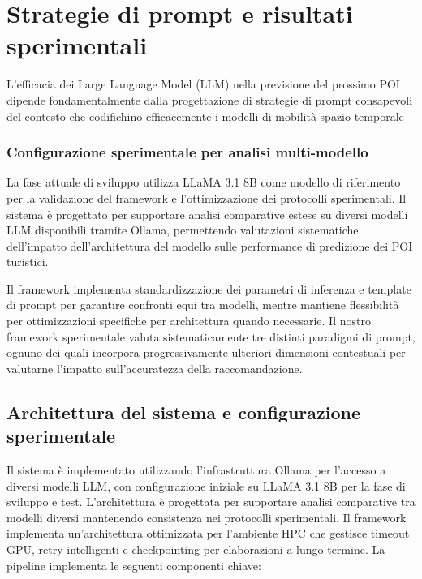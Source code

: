 \chapter{Strategie di prompt e risultati sperimentali}

L'efficacia dei Large Language Model (LLM) nella previsione del prossimo POI dipende fondamentalmente dalla progettazione di strategie di prompt consapevoli del contesto che codifichino efficacemente i modelli di mobilità spazio-temporale

\subsection{Configurazione sperimentale per analisi multi-modello}

La fase attuale di sviluppo utilizza LLaMA 3.1 8B come modello di riferimento per la validazione del framework e l'ottimizzazione dei protocolli sperimentali. Il sistema è progettato per supportare analisi comparative estese su diversi modelli LLM disponibili tramite Ollama, permettendo valutazioni sistematiche dell'impatto dell'architettura del modello sulle performance di predizione dei POI turistici.

Il framework implementa standardizzazione dei parametri di inferenza e template di prompt per garantire confronti equi tra modelli, mentre mantiene flessibilità per ottimizzazioni specifiche per architettura quando necessarie. Il nostro framework sperimentale valuta sistematicamente tre distinti paradigmi di prompt, ognuno dei quali incorpora progressivamente ulteriori dimensioni contestuali per valutarne l'impatto sull'accuratezza della raccomandazione.

\section{Architettura del sistema e configurazione sperimentale}

Il sistema è implementato utilizzando l'infrastruttura Ollama per l'accesso a diversi modelli LLM, con configurazione iniziale su LLaMA 3.1 8B per la fase di sviluppo e test. L'architettura è progettata per supportare analisi comparative tra modelli diversi mantenendo consistenza nei protocolli sperimentali. Il framework implementa un'architettura ottimizzata per l'ambiente HPC che gestisce timeout GPU, retry intelligenti e checkpointing per elaborazioni a lungo termine. La pipeline implementa le seguenti componenti chiave:

